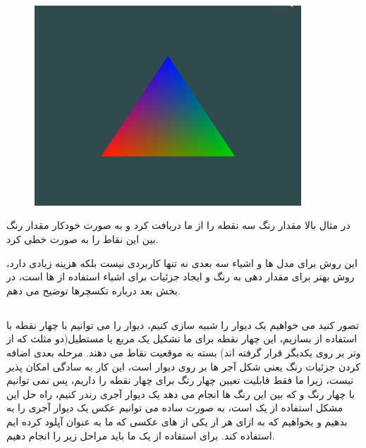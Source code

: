 \documentclass[a4paper, 12pt]{book}
\begin{document}
\vspace*{0.3cm}
\begin{figure}[ht]
    \centering
    \href{https://github.com/devprofile98/shm}{
        \includegraphics[width=10cm]{images/colorfultriangle.png}
    }
    \caption{}
    \label{fig:my_label}
\end{figure}
\vspace*{0.3cm}
    در مثال بالا  مقدار رنگ سه نقطه را از ما دریافت کرد و به صورت خودکار مقدار رنگ بین این نقاط را به صورت خطی  کرد.\par
    این روش برای مدل ها و اشیاء سه بعدی نه تنها کاربردی نیست بلکه هزینه زیادی دارد، روش بهتر برای مقدار دهی به رنگ و ایجاد جزئیات برای اشیاء استفاده از  ها است، در بخش بعد درباره تکسچرها توضیح می دهم.

\newpage
\subsection*{}
\noindent
\normalsize
    تصور کنید می خواهیم یک دیوار را شبیه سازی کنیم، دیوار را می توانیم با چهار نقطه با استفاده از  بسازیم، این چهار نقطه برای ما تشکیل یک مربع یا مستطیل(دو مثلث که از وتر بر روی یکدیگر قرار گرفته اند) بسته به موقعیت نقاط می دهند. مرحله بعدی اضافه کردن جزئیات رنگ یعنی شکل آجر ها بر روی دیوار است، این کار به سادگی امکان پذیر نیست، زیرا ما فقط قابلیت تعیین چهار رنگ برای چهار نقطه را داریم، پس نمی توانیم با چهار رنگ و  که  بین این رنگ ها انجام می دهد یک دیوار آجری رندر کنیم، راه حل این مشکل استفاده از یک  است، به صورت ساده می توانیم عکس یک دیوار آجری را به  بدهیم و بخواهیم که به ازای هر  از یکی از  های عکسی که ما به عنوان  آپلود کرده ایم استفاده کند. برای استفاده از یک  ما باید مراحل زیر را انجام دهیم.
\end{document}
